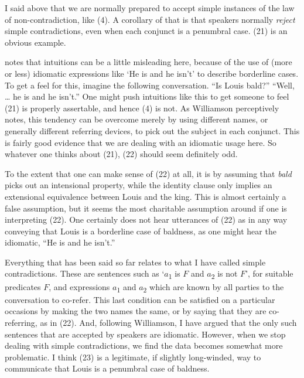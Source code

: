 I said above that we are normally prepared to accept simple instances of the law of non-contradiction, like (4). A corollary of that is that speakers normally \textit{reject} simple contradictions, even when each conjunct is a penumbral case. (21) is an obvious example.


\noindent \cite[136]{Williamson1994-WILV} notes that intuitions can be a little misleading here, because of the use of (more or less) idiomatic expressions like `He is and he isn't' to describe borderline cases. To get a feel for this, imagine the following conversation. ``Is Louis bald?'' ``Well, {\dots} he is and he isn't.'' One might push intuitions like this to get someone to feel (21) is properly assertable, and hence (4) is not. As Williamson perceptively notes, this tendency can be overcome merely by using different names, or generally different referring devices, to pick out the subject in each conjunct. This is fairly good evidence that we are dealing with an idiomatic usage here. So whatever one thinks about (21), (22) should seem definitely odd.


\noindent To the extent that one can make sense of (22) at all, it is by assuming that \textit{bald} picks out an intensional property, while the identity clause only implies an extensional equivalence between Louis and the king. This is almost certainly a false assumption, but it seems the most charitable assumption around if one is interpreting (22). One certainly does not hear utterances of (22) as in any way conveying that Louis is a borderline case of baldness, as one might hear the idiomatic, ``He is and he isn't.''

Everything that has been said so far relates to what I have called simple contradictions. These are sentences such as `\(a\)\textsubscript{1} is \(F\) and \(a\)\textsubscript{2} is not \(F\)', for suitable predicates \(F\), and expressions \(a\)\textsubscript{1} and \(a\)\textsubscript{2} which are known by all parties to the conversation to co-refer. This last condition can be satisfied on a particular occasions by making the two names the same, or by saying that they are co-referring, as in (22). And, following Williamson, I have argued that the only such sentences that are accepted by speakers are idiomatic. However, when we stop dealing with simple contradictions, we find the data becomes somewhat more problematic. I think (23) is a legitimate, if slightly long-winded, way to communicate that Louis is a penumbral case of baldness.

